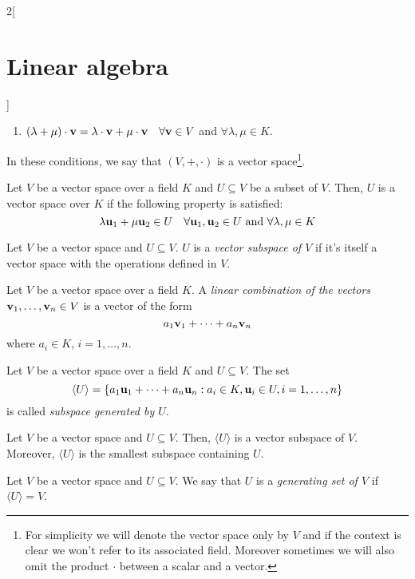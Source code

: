 \documentclass[../../../main.tex]{subfiles}
\begin{document}
\begin{multicols}{2}[\section{Linear algebra}]
\begin{definition}
\begin{enumerate}
      \item $(\lambda+\mu)\cdot\boldsymbol{\mathrm{v}}=\lambda\cdot\boldsymbol{\mathrm{v}}+\mu\cdot\boldsymbol{\mathrm{v}}\quad\forall\boldsymbol{\mathrm{v}}\in V$ and $\forall\lambda,\mu\in K$.
    \end{enumerate}
    In these conditions, we say that $(V,+,\cdot)$ is a vector space\footnote{For simplicity we will denote the vector space only by $V$ and if the context is clear we won't refer to its associated field. Moreover sometimes we will also omit the product $\cdot$ between a scalar and a vector.}.
  \end{definition}
  \begin{definition}
    Let $V$ be a vector space over a field $K$ and $U\subseteq V$ be a subset of $V$. Then, $U$ is a vector space over $K$ if the following property is satisfied:
    $$\lambda \boldsymbol{\mathrm{u}}_1+\mu \boldsymbol{\mathrm{u}}_2\in U\quad\forall \boldsymbol{\mathrm{u}}_1,\boldsymbol{\mathrm{u}}_2\in U\text{ and }\forall\lambda,\mu\in K$$
  \end{definition}
  \begin{definition}
    Let $V$ be a vector space and $U\subseteq V$. $U$ is a \textit{vector subspace of $V$} if it's itself a vector space with the operations defined in $V$.
  \end{definition}
  \begin{definition}
    Let $V$ be a vector space over a field $K$. A \textit{linear combination of the vectors $\boldsymbol{\mathrm{v}}_1,\ldots,\boldsymbol{\mathrm{v}}_n\in V$} is a vector of the form $$a_1\boldsymbol{\mathrm{v}}_1+\cdots+a_n\boldsymbol{\mathrm{v}}_n$$ where $a_i\in K$, $i=1,\ldots,n$.
  \end{definition}
  \begin{definition}
    Let $V$ be a vector space over a field $K$ and $U\subseteq V$. The set $$\langle U\rangle=\{a_1\boldsymbol{\mathrm{u}}_1+\cdots+a_n\boldsymbol{\mathrm{u}}_n:a_i\in K,\boldsymbol{\mathrm{u}}_i\in U,i=1,\ldots,n\}$$ is called \textit{subspace generated by $U$}.
  \end{definition}
  \begin{lemma}
    Let $V$ be a vector space and $U\subseteq V$. Then, $\langle U\rangle$ is a vector subspace of $V$. Moreover, $\langle U\rangle$ is the smallest subspace containing $U$.
  \end{lemma}
  \begin{definition}
    Let $V$ be a vector space and $U\subseteq V$. We say that $U$ is a \textit{generating set of $V$} if $\langle U\rangle=V$.
  \end{definition}

\end{multicols}
\end{document}
